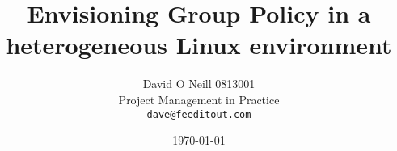 \documentclass[11pt,a4paper]{report}
\begin{document}
	
	
\title{Envisioning Group Policy in a\\ heterogeneous Linux environment}
\author{David O Neill 0813001\\
  Project Management in Practice\\
  \texttt{dave@feeditout.com}}
\date{\today}

\begin{titlepage}
\maketitle
\end{titlepage}

\thispagestyle{empty}
\pagestyle{empty}

\cleardoublepage

\cleardoublepage

\thispagestyle{empty}
\tableofcontents
\thispagestyle{empty}
\pagestyle{plain}












 \label{listoffig}
\nocite{*}
{\small
\cleardoublepage
}


\listoffigures
{}
\end{document}
